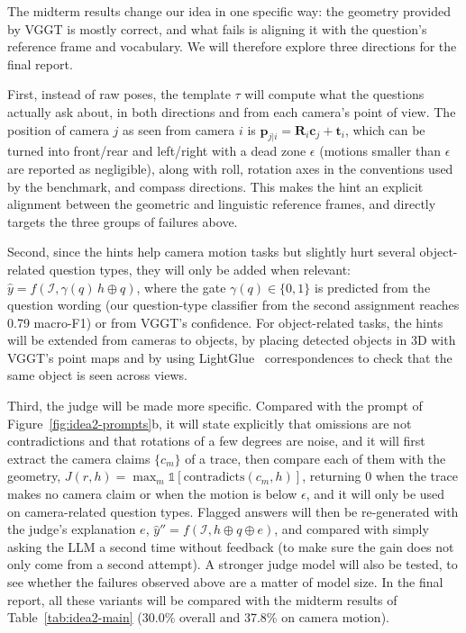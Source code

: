 The midterm results change our idea in one specific way: the geometry provided by VGGT is mostly correct, and what fails is aligning it with the question's reference frame and vocabulary. We will therefore explore three directions for the final report.

First, instead of raw poses, the template $\tau$ will compute what the questions actually ask about, in both directions and from each camera's point of view. The position of camera $j$ as seen from camera $i$ is $\mathbf{p}_{j|i}=\mathbf{R}_i\mathbf{c}_j+\mathbf{t}_i$, which can be turned into front/rear and left/right with a dead zone $\epsilon$ (motions smaller than $\epsilon$ are reported as negligible), along with roll, rotation axes in the conventions used by the benchmark, and compass directions. This makes the hint an explicit alignment between the geometric and linguistic reference frames, and directly targets the three groups of failures above.

Second, since the hints help camera motion tasks but slightly hurt several object-related question types, they will only be added when relevant: $\hat{y}=f(\mathcal{I},\gamma(q)\,h\oplus q)$, where the gate $\gamma(q)\in\{0,1\}$ is predicted from the question wording (our question-type classifier from the second assignment reaches 0.79 macro-F1) or from VGGT's confidence. For object-related tasks, the hints will be extended from cameras to objects, by placing detected objects in 3D with VGGT's point maps and by using LightGlue~\citep{lindenberger2023lightglue} correspondences to check that the same object is seen across views.

Third, the judge will be made more specific. Compared with the prompt of Figure~\ref{fig:idea2-prompts}b, it will state explicitly that omissions are not contradictions and that rotations of a few degrees are noise, and it will first extract the camera claims $\{c_m\}$ of a trace, then compare each of them with the geometry, $J(r,h)=\max_m \mathbb{1}[\mathrm{contradicts}(c_m,h)]$, returning 0 when the trace makes no camera claim or when the motion is below $\epsilon$, and it will only be used on camera-related question types. Flagged answers will then be re-generated with the judge's explanation $e$, $\hat{y}''=f(\mathcal{I},h\oplus q\oplus e)$, and compared with simply asking the LLM a second time without feedback (to make sure the gain does not only come from a second attempt). A stronger judge model will also be tested, to see whether the failures observed above are a matter of model size. In the final report, all these variants will be compared with the midterm results of Table~\ref{tab:idea2-main} (30.0\% overall and 37.8\% on camera motion).
